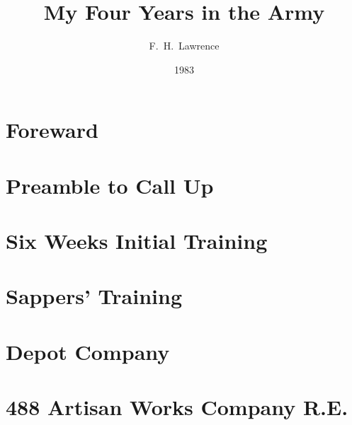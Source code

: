 \documentclass{book}
\title{My Four Years in the Army}
\author{F.~H.~Lawrence}
\date{1983}
\begin{document}
\newcommand{\lcorporals}{LCpls}
\newcommand{\lcorporal}{LCpl}
\newcommand{\Lcorporal}{LCpl}
\newcommand{\corporals}{Cpls}
\newcommand{\corporal}{Cpl}
\newcommand{\Corporal}{Cpl}
\newcommand{\sapper}{Sapper}
\newcommand{\sappers}{Sappers}
\newcommand{\Sapper}{Sapper}
\newcommand{\Sappers}{Sappers}
\newcommand{\sergeantM}{SM}
\newcommand{\CsergeantM}{CSM}
\newcommand{\major}{Major}
\newcommand{\Major}{Major}
\newcommand{\sergeant}{Sgt}
\newcommand{\Sergeant}{Sgt}
\newcommand{\SergeantM}{SM}
\newcommand{\lieutenant}{LT}
\newcommand{\Lieutenant}{LT}
\newcommand{\captain}{Captain}
\newcommand{\Captain}{Captain}
\newcommand{\lsergeants}{L.Sgts}
\newcommand{\lsergeant}{L.Sgt}
\newcommand{\Lsergeant}{L.Sgt}
\newcommand{\SSergeant}{SSgt}
\newcommand{\lcolonel}{Lt.Col.}
\newcommand{\LColonel}{Lt.Col.}
\newcommand{\Lcolonel}{Lt.Col.}
\maketitle
\chapter*{Foreward}



\chapter{Preamble to Call Up}



\chapter{Six Weeks Initial Training}



\chapter{Sappers' Training}



\chapter{Depot Company}



\chapter{488 Artisan Works Company R.E.}
\end{document}
